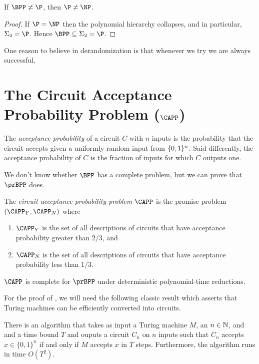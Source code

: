 \begin{proposition}
	If $\BPP \neq \P$, then $\P \neq \NP$.
\end{proposition}
\begin{proof}
  If $\P = \NP$ then the polynomial hierarchy collapses, and in particular,
  $\Sigma_2 = \P$. Hence $\BPP \subseteq \Sigma_2 = \P$.
\end{proof}

One reason to believe in derandomization is that whenever we try we are always
successful. 

\section{The Circuit Acceptance Probability Problem (\texorpdfstring{$\CAPP$}{CAPP})}

The \emph{acceptance probability} of a circuit $C$ with $n$ inputs is the probability that the circuit accepts given a uniformly random input from $\{0, 1\}^n$. Said differently, the acceptance probability of $C$ is the fraction of inputs for which $C$ outputs one. 

We don't know whether $\BPP$ has a complete problem, but we can prove that $\prBPP$ does.

\begin{definition}
  The \emph{circuit acceptance probability problem} $\CAPP$ is the promise problem $(\CAPP_Y, \CAPP_N)$ where
  \begin{enumerate}
    \item $\CAPP_Y$ is the set of all descriptions of circuits that have
      acceptance probability greater than $2/3$, and
    \item $\CAPP_N$ is the set of all descriptions of circuits that have
      acceptance probability less than $1/3$.
  \end{enumerate}
\end{definition}

\begin{theorem}\label{thm:complete}
  $\CAPP$ is complete for $\prBPP$ under deterministic polynomial-time reductions.
\end{theorem}

For the proof of , we will need the following classic result which asserts that
Turing machines can be efficiently converted into circuits.
\begin{lemma}\label{lem:tm-to-circuit}
  There is an algorithm that takes as input a Turing machine $M$, an $n \in
  \mathbb{N}$, and and a time bound $T$ and ouputs a circuit $C_n$ on $n$ inputs
  such that $C_n$ accepts $x \in \{0, 1\}^n$ if and only if $M$ accepts
  $x$ in $T$ steps. Furthermore, the algorithm runs in time $O(T^2)$.
\end{lemma}

